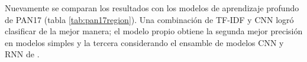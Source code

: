 Nuevamente se comparan los resultados con los modelos de aprendizaje profundo de PAN17 (tabla \ref{tab:pan17region}). Una combinación de TF-IDF y CNN \parencite{schaetti2017author} logró clasificar de la mejor manera; el modelo propio obtiene la segunda mejor precisión en modelos simples y la tercera considerando el ensamble de modelos CNN y RNN de \textcite{miura2017author}.



